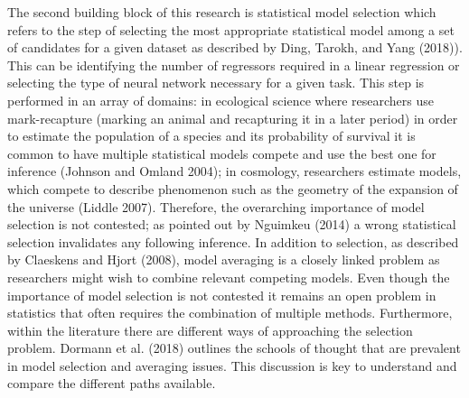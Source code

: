 \documentclass[12pt,]{article}
\begin{document}
The second building block of this research is statistical model selection which refers to the step of selecting the most appropriate statistical model among a set of candidates for a given dataset as described by Ding, Tarokh, and Yang (2018)). This can be identifying the number of regressors required in a linear regression or selecting the type of neural network necessary for a given task. This step is performed in an array of domains: in ecological science where researchers use mark-recapture (marking an animal and recapturing it in a later period) in order to estimate the population of a species and its probability of survival it is common to have multiple statistical models compete and use the best one for inference (Johnson and Omland 2004); in cosmology, researchers estimate models, which compete to describe phenomenon such as the geometry of the expansion of the universe (Liddle 2007). Therefore, the overarching importance of model selection is not contested; as pointed out by Nguimkeu (2014) a wrong statistical selection invalidates any following inference. In addition to selection, as described by Claeskens and Hjort (2008), model averaging is a closely linked problem as researchers might wish to combine relevant competing models. Even though the importance of model selection is not contested it remains an open problem in statistics that often requires the combination of multiple methods. Furthermore, within the literature there are different ways of approaching the selection problem. Dormann et al. (2018) outlines the schools of thought that are prevalent in model selection and averaging issues. This discussion is key to understand and compare the different paths available.
\end{document}
